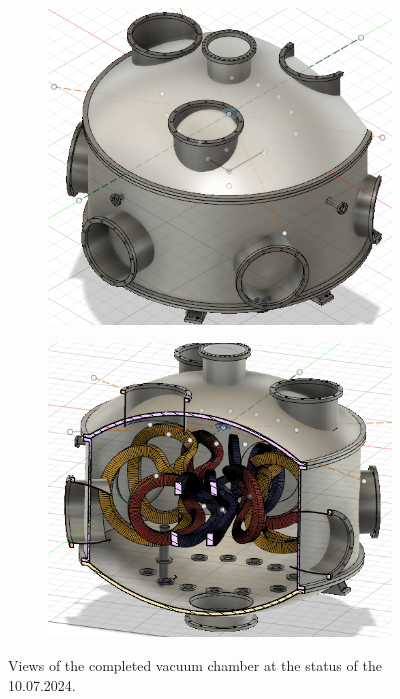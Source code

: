 \begin{figure}[H]
    \centering
    \begin{subfigure}[b]{0.4\textwidth}
        \centering
        \includegraphics[width=1\textwidth]{Images/06_Vacuum/Vakuumkammer_final.PNG}
        \label{fig:Kammer}
    \end{subfigure}
    \hfill
    \begin{subfigure}[b]{0.4\textwidth}
        \centering
        \includegraphics[width=1\textwidth]{Images/06_Vacuum/Vakuumkammer_final_Schnitt.PNG}
        \label{fig:Kammer_Schnitt}
    \end{subfigure}
    \caption{Views of the completed vacuum chamber at the status of the 10.07.2024.}
    \label{fig:Kammer_all}
\end{figure}


